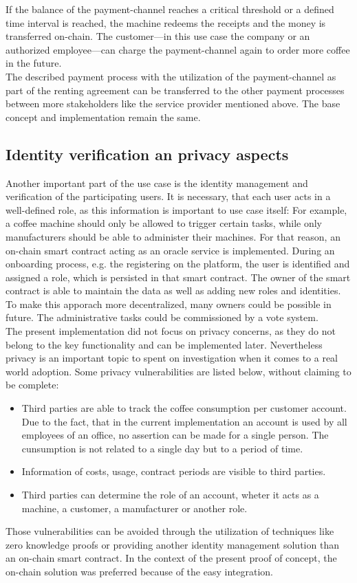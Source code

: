 \documentclass[conference]{IEEEtran}
\begin{document}
If the balance of the payment-channel reaches a critical threshold or a defined time interval is reached, the machine redeems the receipts and the money is transferred on-chain. The customer---in this use case the company or an authorized employee---can charge the payment-channel again to order more coffee in the future.\\
The described payment process with the utilization of the payment-channel as part of the renting agreement can be transferred to the other payment processes between more stakeholders like the service provider mentioned above. The base concept and implementation remain the same.

\subsection{Identity verification an privacy aspects}
Another important part of the use case is the identity management and verification of the participating users. It is necessary, that each user acts in a well-defined role, as this information is important to use case itself: For example, a coffee machine should only be allowed to trigger certain tasks, while only manufacturers should be able to administer their machines. For that reason, an on-chain smart contract acting as an oracle service is implemented. During an onboarding process, e.g. the registering on the platform, the user is identified and assigned a role, which is persisted in that smart contract. The owner of the smart contract is able to maintain the data as well as adding new roles and identities. To make this apporach more decentralized, many owners could be possible in future. The administrative tasks could be commissioned by a vote system.\\
The present implementation did not focus on privacy concerns, as they do not belong to the key functionality and can be implemented later. Nevertheless privacy is an important topic to spent on investigation when it comes to a real world adoption. Some privacy vulnerabilities are listed below, without claiming to be complete:\\
\begin{itemize}
  \item Third parties are able to track the coffee consumption per customer account. Due to the fact, that in the current implementation an account is used by all employees of an office, no assertion can be made for a single person. The cunsumption is not related to a single day but to a period of time.
  \item Information of costs, usage, contract periods are visible to third parties.
  \item Third parties can determine the role of an account, wheter it acts as a machine, a customer, a manufacturer or another role.
\end{itemize}
Those vulnerabilities can be avoided through the utilization of techniques like zero knowledge proofs \cite{XYZ} or providing another identity management solution than an on-chain smart contract. In the context of the present proof of concept, the on-chain solution was preferred because of the easy integration.
\end{document}
